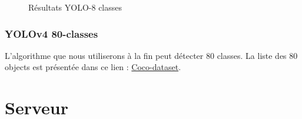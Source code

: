 {\begin{figure}[H]
    \centering
    \qquad
    \qquad
    \caption{Résultats YOLO-8 classes}
    \label{fig:example}
\end{figure}

\subsection{YOLOv4 80-classes}
L'algorithme que nous utiliserons à la fin peut détecter 80 classes. La liste des 80 objects est présentée dans ce lien : \href{https://github.com/mohammedAljadd/iEars/blob/main/coco-dataset-list/coco.names}{Coco-dataset}.


\pagebreak
{}

\chapter{Serveur}\thispagestyle{fancy}

}
